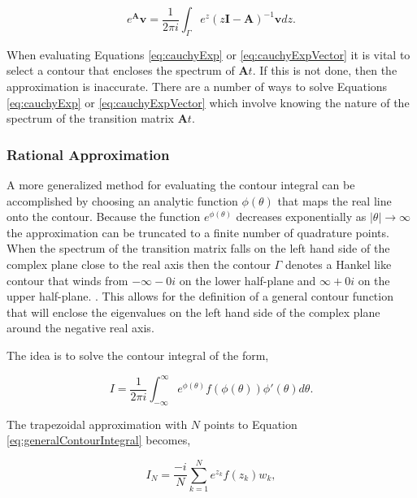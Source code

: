 \begin{equation}
	e^{\boldsymbol{A}}\boldsymbol{v} = \frac{1}{2\pi i}\int_{\Gamma} e^{z}(z\boldsymbol{I} - \boldsymbol{A})^{-1}\boldsymbol{v}dz.
	\label{eq:cauchyExpVector}
\end{equation}

\noindent When evaluating Equations \ref{eq:cauchyExp} or \ref{eq:cauchyExpVector} it is vital to select a contour that encloses the spectrum of $\boldsymbol{A}t$. If this is not done, then the approximation is inaccurate. There are a number of ways to solve Equations \ref{eq:cauchyExp} or \ref{eq:cauchyExpVector} which involve knowing the nature of the spectrum of the transition matrix $\boldsymbol{A}t$. 


\subsubsection{Rational Approximation}
A more generalized method for evaluating the contour integral can be accomplished by choosing an analytic function $\phi(\theta)$ that maps the real line onto the contour. Because the function $e^{\phi(\theta)}$ decreases exponentially as $|\theta| \rightarrow \infty$ the approximation can be truncated to a finite number of quadrature points. When the spectrum of the transition matrix falls on the left hand side of the complex plane close to the real axis then the contour $\Gamma$ denotes a Hankel like contour that winds from $-\infty-0i$ on the lower half-plane and $\infty+0i$ on the upper half-plane. \cite{Trefethen2006}. This allows for the definition of a general contour function that will enclose the eigenvalues on the left hand side of the complex plane around the negative real axis. 

The idea is to solve the contour integral of the form,

\begin{equation}
    I = \frac{1}{2\pi i}\int_{-\infty}^{\infty}e^{\phi(\theta)}f(\phi(\theta))\phi'(\theta)d\theta.
    \label{eq:generalContourIntegral}
\end{equation}

\noindent The trapezoidal approximation with $N$ points to Equation \ref{eq:generalContourIntegral} becomes,

\begin{equation}
    I_{N} = \frac{-i}{N}\sum_{k=1}^{N}e^{z_{k}}f(z_{k})w_{k},
    \label{eq:generalContourIntegralNPoints}
\end{equation}

